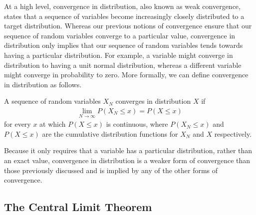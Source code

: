 At a  high level, convergence in distribution, also known as weak convergence, states that a sequence of variables become
increasingly closely distributed to a target distribution.  Whereas our previous notions of
convergence ensure that our sequence of random variables converge to a particular value, 
convergence in distribution only implies that our sequence of random variables tends towards
having a particular distribution.  For example, a variable might converge in distribution to
having a unit normal distribution, whereas a different variable might converge in probability
to zero. More formally, we can define convergence in distribution as follows.
\begin{definition}
	A sequence of random variables $X_N$ converges in distribution $X$  if
	\begin{align}
		\lim\limits_{N\rightarrow\infty} P(X_N \le x) = P(X \le x)
	\end{align}
	for every $x$ at which $P(X\le x)$ is continuous, where $P(X_N \le x) $ and $P(X \le x)$
	are the cumulative distribution functions for $X_N$ and $X$ respectively.
\end{definition}
\noindent Because it only requires that a variable has a particular distribution, rather than an
 exact value, convergence in distribution is a weaker form of convergence than those previously
 discussed and is implied by any of the other forms of convergence.  
\vspace{5pt}

\subsection{The Central Limit Theorem}
\label{sec:inf:mc:clt}

